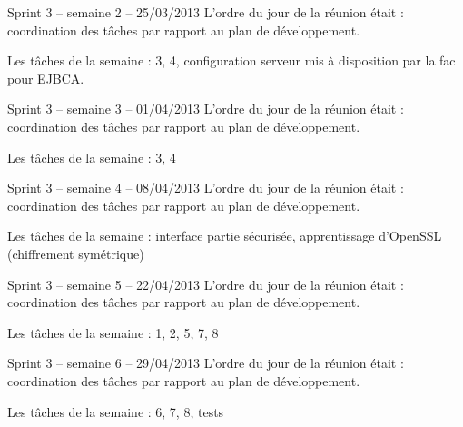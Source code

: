 \documentclass[a4paper,11pt,french]{article}
\begin{document}
\begin{paragraph}{Sprint 3 -- semaine 2 -- 25/03/2013}
L’ordre du jour de la réunion était : coordination des tâches par rapport au plan de développement.

Les tâches de la semaine : 3, 4, configuration serveur mis à disposition par la fac pour EJBCA.
\end{paragraph}

\begin{paragraph}{Sprint 3 -- semaine 3 -- 01/04/2013}
L’ordre du jour de la réunion était : coordination des tâches par rapport au plan de développement.

Les tâches de la semaine : 3, 4
\end{paragraph}

\begin{paragraph}{Sprint 3 -- semaine 4 -- 08/04/2013}
L’ordre du jour de la réunion était : coordination des tâches par rapport au plan de développement.

Les tâches de la semaine : interface partie sécurisée, apprentissage d'OpenSSL (chiffrement symétrique)
\end{paragraph}

\begin{paragraph}{Sprint 3 -- semaine 5 -- 22/04/2013}
L’ordre du jour de la réunion était : coordination des tâches par rapport au plan de développement.

Les tâches de la semaine : 1, 2, 5, 7, 8
\end{paragraph}

\begin{paragraph}{Sprint 3 -- semaine 6 -- 29/04/2013}
L’ordre du jour de la réunion était : coordination des tâches par rapport au plan de développement.

Les tâches de la semaine : 6, 7, 8, tests
\end{paragraph}
\end{document}
